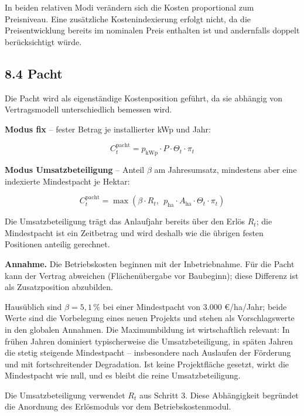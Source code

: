 \documentclass[
  a4paper,
  10pt]{article}
\renewenvironment{quote}
  {\begin{tcolorbox}[
      enhanced,
      breakable,
      colback=Wash,
      colframe=Brand,
      boxrule=0pt,
      leftrule=2.2pt,
      arc=0pt,
      left=8pt,right=8pt,top=6pt,bottom=6pt,
      before skip=8pt,after skip=9pt
    ]\small\color{InkSoft}}
  {\end{tcolorbox}}
\begin{document}
In beiden relativen Modi verändern sich die Kosten proportional zum
Preisniveau. Eine zusätzliche Kostenindexierung erfolgt nicht, da die
Preisentwicklung bereits im nominalen Preis enthalten ist und
andernfalls doppelt berücksichtigt würde.

\hypertarget{pacht}{%
\subsection{8.4 Pacht}\label{pacht}}

Die Pacht wird als eigenständige Kostenposition geführt, da sie abhängig
von Vertragsmodell unterschiedlich bemessen wird.

\textbf{Modus fix} -- fester Betrag je installierter kWp und Jahr:

\[ C^{\mathrm{pacht}}_t = p_{\mathrm{kWp}} \cdot P \cdot \Theta_t \cdot \pi_t \]

\textbf{Modus Umsatzbeteiligung} -- Anteil \(\beta\) am Jahresumsatz,
mindestens aber eine indexierte Mindestpacht je Hektar:

\[ C^{\mathrm{pacht}}_t = \max\left(\beta \cdot R_t,\ \ p_{\mathrm{ha}} \cdot A_{\mathrm{ha}} \cdot \Theta_t \cdot \pi_t\right) \]

Die Umsatzbeteiligung trägt das Anlaufjahr bereits über den Erlös
\(R_t\); die Mindestpacht ist ein Zeitbetrag und wird deshalb wie die
übrigen festen Positionen anteilig gerechnet.

\begin{quote}
\textbf{Annahme.} Die Betriebskosten beginnen mit der Inbetriebnahme.
Für die Pacht kann der Vertrag abweichen (Flächenübergabe vor
Baubeginn); diese Differenz ist als Zusatzposition abzubilden.
\end{quote}

Hausüblich sind \(\beta = 5{,}1\,\%\) bei einer Mindestpacht von 3.000
€/ha/Jahr; beide Werte sind die Vorbelegung eines neuen Projekts und
stehen als Vorschlagswerte in den globalen Annahmen. Die Maximumbildung
ist wirtschaftlich relevant: In frühen Jahren dominiert typischerweise
die Umsatzbeteiligung, in späten Jahren die stetig steigende
Mindestpacht -- insbesondere nach Auslaufen der Förderung und mit
fortschreitender Degradation. Ist keine Projektfläche gesetzt, wirkt die
Mindestpacht wie null, und es bleibt die reine Umsatzbeteiligung.

\begin{quote}
Die Umsatzbeteiligung verwendet \(R_t\) aus Schritt 3. Diese
Abhängigkeit begründet die Anordnung des Erlösmoduls vor dem
Betriebskostenmodul.
\end{quote}
\end{document}
